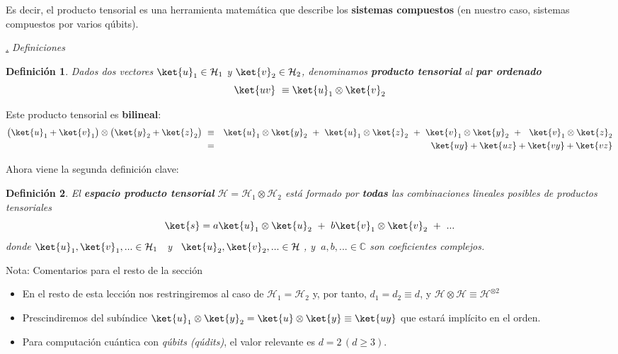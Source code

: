\documentclass[a4paper,11pt]{book} %
\newtheorem{definicion_contador}{Definición}
\newcommand{\Definicion}[1]{
		\begin{mybox_gray2}{}
			\begin{definicion_contador}
				 #1 
			\end{definicion_contador} 
		\end{mybox_gray2}
	}
\numberwithin{equation}{chapter}
\def\subsubiContadorIt{\par\addtocounter{subsubsection}{1}\underline{\it\thesubsubsection.}\hskip0.5cm \setcounter{subsubsubsectionIt}{0}}
\newcommand{\SubsubiIt}[1]{
		\subsubiContadorIt \textit{#1}
	}
\newcounter{subsubsubsectionIt}[subsubsection]
\begin{document}
Es decir, el producto tensorial es una herramienta matemática que describe los \textbf{sistemas compuestos} (en nuestro caso, sistemas compuestos por varios qúbits).

			\SubsubiIt{Definiciones}

\Definicion{
Dados dos vectores $\ket{u}_1\in \mathcal{H}_1$ y  $\ket{v}_2\in \mathcal{H}_2$, denominamos \textbf{producto tensorial} al \textbf{par ordenado}
	\begin{equation}
	\ket{uv} ~\equiv \ket{u}_1\otimes \ket{v}_2
	\end{equation}
}
Este producto tensorial es \textbf{bilineal}:
\begin{eqnarray*}
\big(\ket{u}_1+\ket{v}_1\big)\otimes \big(\ket{y}_2+\ket{z}_2\big) ~&\equiv &
\ket{u}_1\otimes\ket{y}_2 ~+~ \ket{u}_1\otimes\ket{z}_2 ~+~ \ket{v}_1\otimes\ket{y}_2 ~+~~
 \ket{v}_1\otimes\ket{z}_2 \\
 &=& \ket{uy} + \ket{uz} + \ket{vy} + \ket{vz}
\end{eqnarray*}

Ahora viene la segunda definición clave:
	\Definicion{
	El \textbf{espacio producto tensorial}  $\mathcal{H} = \mathcal{H}_1 \otimes \mathcal{H}_2$ está formado por  \textbf{todas} las combinaciones lineales posibles de  productos tensoriales 
	\begin{equation}
	\ket{s}= a\ket{u}_1\otimes\ket{u}_2 ~+~ b \ket{v}_1\otimes\ket{v}_2 ~+ ~...
	\end{equation}
   donde  $\ket{u}_1,\ket{v}_1,...\in \mathcal{H}_1\, ~$ y $~\, \ket{u}_2,\ket{v}_2,...\in \mathcal{H}~$,
    y $~a,b,... \in {\mathbb C}$ son coeficientes complejos.
	}

	\begin{mybox_blue}{Nota: Comentarios para el resto de la sección}
	\begin{itemize}
		\item En el resto de esta lección nos restringiremos al caso de $\mathcal{H}_1 = \mathcal{H}_2$ y, por tanto, $d_1 = d_2 \equiv d$, y  $\mathcal{H}\otimes \mathcal{H} \equiv \mathcal{H}^{\otimes 2}$ 
    	\item Prescindiremos del subíndice $\ket{u}_1\otimes \ket{y}_2=\ket{u}\otimes \ket{y} \equiv \ket{uy}$ que estará implícito en el orden. 
   		\item Para computación cuántica con \textit{qúbits (qúdits)}, el valor relevante es $d=2\,(d\geq 3)$. 
	\end{itemize}
	\end{mybox_blue}
\end{document}
